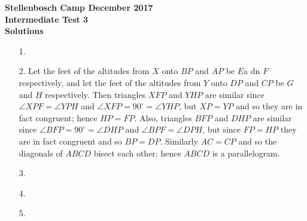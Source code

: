 \documentclass[a4paper,12pt]{article}
\begin{document}
\begin{center}
\textbf{Stellenbosch Camp December 2017 \\ Intermediate Test 3} \\
\textbf{Solutions}
\end{center}


\begin{enumerate}
    
    \item[1.] 
    
    
    \item[2.] Let the feet of the altitudes from $X$ onto $BP$ and $AP$ be $E$a dn $F$ respectively, and let the feet of the altitudes from $Y$ onto $DP$ and $CP$ be $G$ and $H$ respectively. Then triangles $XFP$ and $YHP$ are similar since $\angle XPF = \angle YPH$ and $\angle XFP = 90^\circ = \angle YHP$, but $XP = YP$ and so they are in fact congruent; hence $HP = FP$. Also, triangles $BFP$ and $DHP$ are similar since $\angle BFP = 90^\circ = \angle DHP$ and $\angle BPF = \angle DPH$, but since $FP = HP$ they are in fact congruent and so $BP = DP$. Similarly $AC = CP$ and so the diagonals of $ABCD$ bisect each other; hence $ABCD$ is a parallelogram.
    
    
    \item[3.] 
    
    
    \item[4.]     

    \item[5.]  %
    

\end{enumerate}
\end{document}
